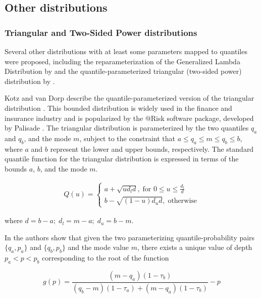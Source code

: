 \documentclass[
  fleqn,
  deca,
  blindrev
]{informs4}
\begin{document}
\subsection{Other distributions}\label{other-distributions}

\subsubsection{Triangular and Two-Sided Power
distributions}\label{triangular-and-two-sided-power-distributions}

Several other distributions with at least some parameters mapped to
quantiles were proposed, including the reparameterization of the
Generalized Lambda Distribution by
\citep{chalabi2012FlexibleDistributionModeling} and the
quantile-parameterized triangular (two-sided power) distribution by
\citep{kotz2004BetaOtherContinuous}.

Kotz and van Dorp \citep{kotz2004BetaOtherContinuous} describe the
quantile-parameterized version of the triangular distribution
\citep{johnson1997TriangularDistributionProxy}. This bounded
distribution is widely used in the finance and insurance industry and is
popularized by the @Risk software package, developed by Palisade
\citep{palisadecorporation2009GuideUsingRISK}. The triangular
distribution is parameterized by the two quantiles \(q_{a}\) and
\(q_{b}\), and the mode \(m\), subject to the constraint that
\(a\leq q_a\leq m\leq q_b\leq b\), where \(a\) and \(b\) represent the
lower and upper bounds, respectively. The standard quantile function for
the triangular distribution is expressed in terms of the bounds \(a\),
\(b\), and the mode \(m\).

\[
\begin{gathered}
Q(u)=\begin{cases}
a+\sqrt{ud_ld}, \; \text{for } 0\leq u \leq\frac{d_l}{d}\\
b-\sqrt{(1-u)d_ud}, \; \text{otherwise}
\end{cases}
\end{gathered}
\]

where \(d=b-a;\; d_l=m-a;\; d_u=b-m\).

In \citep{kotz2004BetaOtherContinuous} the authors show that given the
two parameterizing quantile-probability pairs \(\{q_a,p_a\}\) and
\(\{q_b,p_b\}\) and the mode value \(m\), there exists a unique value of
depth \(p_a<p<p_b\) corresponding to the root of the function

\[
g(p)=\frac{(m-q_a)(1-\tau_b)}{(q_b-m)(1-\tau_a)+(m-q_a)(1-\tau_b)}-p
\]
\end{document}
